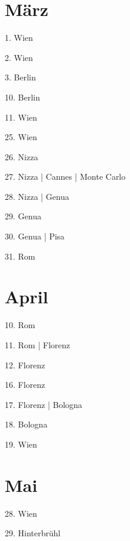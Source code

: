\documentclass[twoside=false,titlepage=false,open=any, parskip=never, fontsize=10pt, headings=small, chapterprefix=false, appendixprefix=false, DIV=15]{scrbook}
\begin{document}
\begin{multicols}{3}
            \section*{März}
            1. Wien\par
            2. Wien\par
            3. Berlin\par
            10. Berlin\par
            11. Wien\par
            25. Wien\par
            26. Nizza\par
            27. Nizza | Cannes | Monte Carlo\par
            28. Nizza | Genua\par
            29. Genua\par
            30. Genua | Pisa\par
            31. Rom\par
            \section*{April}
            10. Rom\par
            11. Rom | Florenz\par
            12. Florenz\par
            16. Florenz\par
            17. Florenz | Bologna\par
            18. Bologna\par
            19. Wien\par
            \section*{Mai}
            28. Wien\par
            29. Hinterbrühl\par

\end{multicols}
\end{document}
